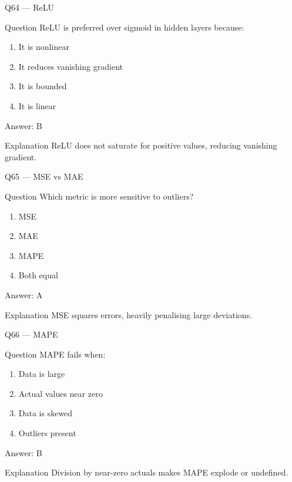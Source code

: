 \documentclass[aspectratio=169,8pt]{beamer}
\begin{document}
	\begin{frame}{Q64 --- ReLU}
		\begin{block}{Question}
			ReLU is preferred over sigmoid in hidden layers because:
		\end{block}
		\begin{enumerate}
			\item It is nonlinear
			\item It reduces vanishing gradient
			\item It is bounded
			\item It is linear
		\end{enumerate}
		\begin{exampleblock}{Answer: B}\end{exampleblock}
		\begin{block}{Explanation}
			ReLU does not saturate for positive values, reducing vanishing gradient.
		\end{block}
	\end{frame}
	
	\begin{frame}{Q65 --- MSE vs MAE}
		\begin{block}{Question}
			Which metric is more sensitive to outliers?
		\end{block}
		\begin{enumerate}
			\item MSE
			\item MAE
			\item MAPE
			\item Both equal
		\end{enumerate}
		\begin{exampleblock}{Answer: A}\end{exampleblock}
		\begin{block}{Explanation}
			MSE squares errors, heavily penalising large deviations.
		\end{block}
	\end{frame}
	
	\begin{frame}{Q66 --- MAPE}
		\begin{block}{Question}
			MAPE fails when:
		\end{block}
		\begin{enumerate}
			\item Data is large
			\item Actual values near zero
			\item Data is skewed
			\item Outliers present
		\end{enumerate}
		\begin{exampleblock}{Answer: B}\end{exampleblock}
		\begin{block}{Explanation}
			Division by near-zero actuals makes MAPE explode or undefined.
		\end{block}
	\end{frame}
	
\end{document}
